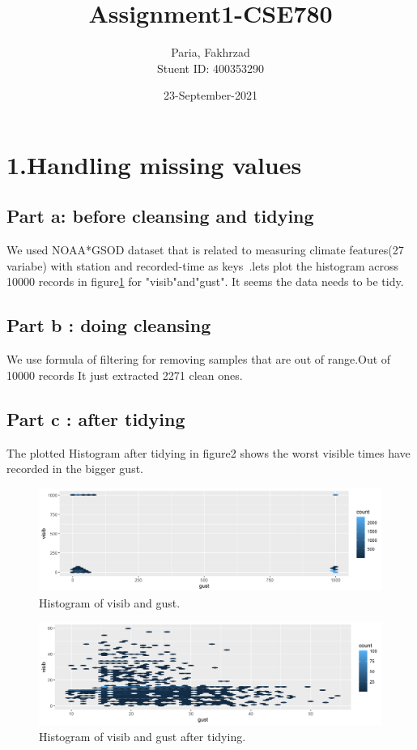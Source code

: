 \documentclass[a4paper, 11pt]{article}
\title{Assignment1-CSE780}
\author{Paria, Fakhrzad \\ Stuent ID: 400353290 }
\date{23-September-2021}
\begin{document}
\maketitle
\newpage
\section*{1.Handling missing values}
\subsection*{Part a:  before cleansing and tidying}
 We used NOAA*GSOD dataset that is related to measuring climate features(27 variabe) with station and recorded-time as keys~\cite{ref}.lets plot the histogram across 10000 records in figure\ref{Figure1a} for "visib"and"gust". It seems the data needs to be tidy.
\subsection*{Part b : doing cleansing}
We use formula of filtering for removing samples that are out of range.Out of 10000 records It just extracted 2271 clean ones.
\subsection*{Part c : after tidying}
The plotted Histogram after tidying in figure2 shows the worst visible times have recorded in the bigger gust.
 \begin{figure}[H]
	\includegraphics[width = \textwidth]{figure1a.png}
	\caption{Histogram of visib and gust.}
	\label{Figure1a}
\end{figure}
 \begin{figure}[H]
	\includegraphics[width = \textwidth]{figure1b.png}
	\caption{Histogram of visib and gust after tidying.}
	\label{Figure1b}
\end{figure}
\end{document}
